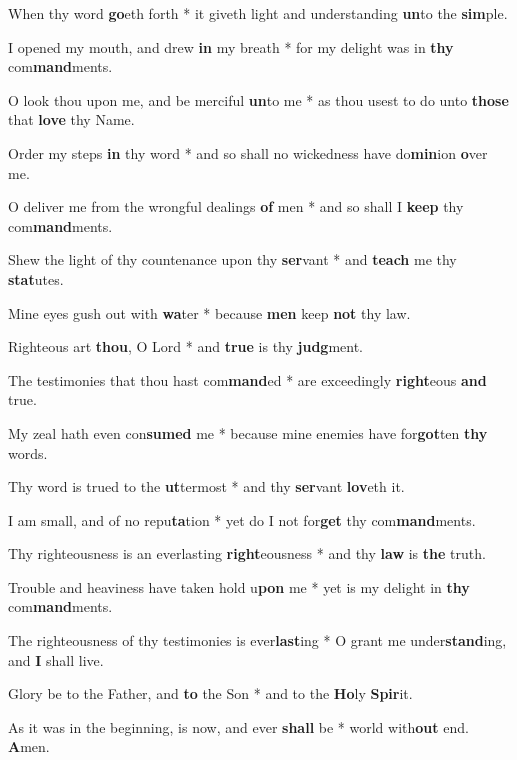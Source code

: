 \begin{multicols}{2}
	When thy word \textbf{go}eth forth * it giveth light and understanding \textbf{un}to the \textbf{sim}ple.
	
	I opened my mouth, and drew \textbf{in} my breath * for my delight was in \textbf{thy} com\textbf{mand}ments.
	
	O look thou upon me, and be merciful \textbf{un}to me * as thou usest to do unto \textbf{those} that \textbf{love} thy Name.
	
	Order my steps \textbf{in} thy word * and so shall no wickedness have do\textbf{min}ion \textbf{o}ver me.
	
	O deliver me from the wrongful dealings \textbf{of} men * and so shall I \textbf{keep} thy com\textbf{mand}ments.
	
	Shew the light of thy countenance upon thy \textbf{ser}vant * and \textbf{teach} me thy \textbf{stat}utes.
	
	Mine eyes gush out with \textbf{wa}ter * because \textbf{men} keep \textbf{not} thy law.
	
	Righteous art \textbf{thou}, O Lord * and \textbf{true} is thy \textbf{judg}ment.
	
	The testimonies that thou hast com\textbf{mand}ed * are exceedingly \textbf{right}eous \textbf{and} true.
	
	My zeal hath even con\textbf{sumed} me * because mine enemies have for\textbf{got}ten \textbf{thy} words.
	
	Thy word is trued to the \textbf{ut}termost * and thy \textbf{ser}vant \textbf{lov}eth it.
	
	I am small, and of no repu\textbf{ta}tion * yet do I not for\textbf{get} thy com\textbf{mand}ments.
	
	Thy righteousness is an everlasting \textbf{right}eousness * and thy \textbf{law} is \textbf{the} truth.
	
	Trouble and heaviness have taken hold u\textbf{pon} me * yet is my delight in \textbf{thy} com\textbf{mand}ments.
	
	The righteousness of thy testimonies is ever\textbf{last}ing * O grant me under\textbf{stand}ing, and \textbf{I} shall live.
	
	Glory be to the Father, and \textbf{to} the Son * and to the \textbf{Ho}ly \textbf{Spir}it.
	
	As it was in the beginning, is now, and ever \textbf{shall} be * world with\textbf{out} end. \textbf{A}men.
\end{multicols}